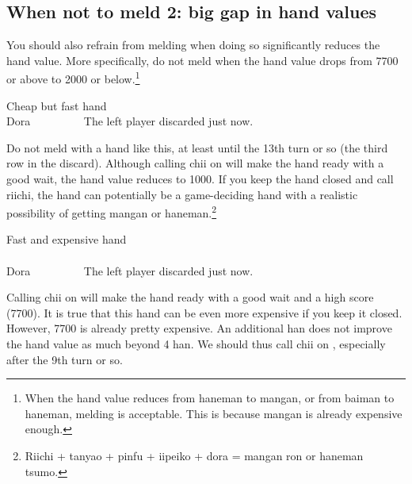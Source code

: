 \bigskip
\subsection{When not to meld 2: big gap in hand values}
You should also refrain from melding when doing so significantly reduces the hand value. More specifically, do not meld when the hand value drops from 7700 or above to 2000 or below.\footnote{When the hand value reduces from {\jap haneman} to {\jap mangan}, or from {\jap baiman} to {\jap haneman}, melding is acceptable. This is because {\jap mangan} is already expensive enough.} 

\bigskip
\begin{itembox}[r]{Cheap but fast hand}
\bp
{}~~\\
\hfill\footnotesize{{\jap Dora}~~~~~~~~~}
\ep
\vspace{-15pt}The left player discarded {\LARGE{}} just now.
\end{itembox}

\bigskip
Do not meld with a hand like this, at least until the 13th turn or so (the third row in the discard). Although calling {\jap chii} on {\LARGE{}} will make the hand ready with a good wait, the hand value reduces to 1000. 
If you keep the hand closed and call riichi, the hand can potentially be a game-deciding hand with a realistic possibility of getting {\jap mangan} or {\jap haneman}.\footnote{{\jap Riichi} + {\jap tanyao + pinfu + iipeiko + dora} = {\jap mangan ron} or {\jap haneman tsumo}.} 

\bigskip
\begin{itembox}[r]{Fast and expensive hand}
\bp
{}\\ \vspace{-16pt}
\rfw{}~~\\
\hfill\footnotesize{{\jap Dora}~~~~~~~~~}
\ep
\vspace{-15pt}The left player discarded {\LARGE{}} just now.
\end{itembox}

\bigskip
Calling {\jap chii} on {\LARGE{}} will make the hand ready with a good wait and a high score (7700). It is true that this hand can be even more expensive if you keep it closed. However, 7700 is already pretty expensive. An additional {\jap han} does not improve the hand value as much beyond 4 {\jap han}. We should thus call {\jap chii} on {\LARGE{}}, especially after the 9th turn or so. 

